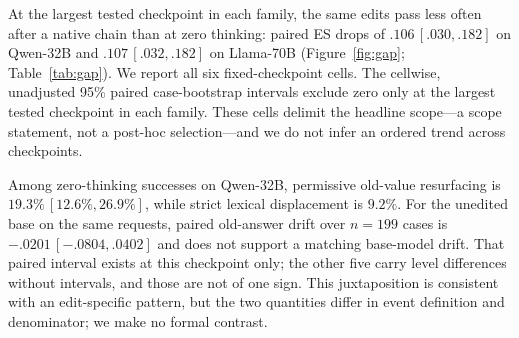 \documentclass[letterpaper]{article} %
\begin{document}
At the largest tested checkpoint in each family, the same edits pass less often after a native chain than at zero thinking: paired ES drops of \(.106\,[.030,.182]\) on Qwen-32B and \(.107\,[.032,.182]\) on Llama-70B (Figure~\ref{fig:gap}; Table~\ref{tab:gap}). %
We report all six fixed-checkpoint cells. The cellwise, unadjusted 95\% paired case-bootstrap intervals exclude zero only at the largest tested checkpoint in each family. These cells delimit the headline scope---a scope statement, not a post-hoc selection---and we do not infer an ordered trend across checkpoints. %

Among zero-thinking successes on Qwen-32B, permissive old-value resurfacing is \(19.3\%\,[12.6\%,26.9\%]\), while strict lexical displacement is \(9.2\%\). %
For the unedited base on the same requests, paired old-answer drift over \(n=199\) cases is \(-.0201\,[-.0804,.0402]\) and does not support a matching base-model drift.  That paired interval exists at this checkpoint only; the other five carry level differences without intervals, and those are not of one sign. %
This juxtaposition is consistent with an edit-specific pattern, but the two quantities differ in event definition and denominator; we make no formal contrast.
\end{document}
